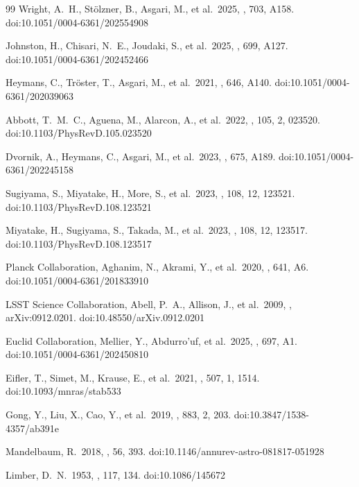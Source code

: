 \documentclass[a4paper, 11pt]{article}
\begin{document}
\begin{thebibliography}{99}
 Wright, A.~H., St{\"o}lzner, B., Asgari, M., et al.\ 2025, \aap, 703, A158. doi:10.1051/0004-6361/202554908

 Johnston, H., Chisari, N.~E., Joudaki, S., et al.\ 2025, \aap, 699, A127. doi:10.1051/0004-6361/202452466

 Heymans, C., Tr{\"o}ster, T., Asgari, M., et al.\ 2021, \aap, 646, A140. doi:10.1051/0004-6361/202039063

 Abbott, T.~M.~C., Aguena, M., Alarcon, A., et al.\ 2022, \prd, 105, 2, 023520. doi:10.1103/PhysRevD.105.023520

 Dvornik, A., Heymans, C., Asgari, M., et al.\ 2023, \aap, 675, A189. doi:10.1051/0004-6361/202245158

 Sugiyama, S., Miyatake, H., More, S., et al.\ 2023, \prd, 108, 12, 123521. doi:10.1103/PhysRevD.108.123521

 Miyatake, H., Sugiyama, S., Takada, M., et al.\ 2023, \prd, 108, 12, 123517. doi:10.1103/PhysRevD.108.123517

 Planck Collaboration, Aghanim, N., Akrami, Y., et al.\ 2020, \aap, 641, A6. doi:10.1051/0004-6361/201833910

 LSST Science Collaboration, Abell, P.~A., Allison, J., et al.\ 2009, , arXiv:0912.0201. doi:10.48550/arXiv.0912.0201

 Euclid Collaboration, Mellier, Y., Abdurro'uf, et al.\ 2025, \aap, 697, A1. doi:10.1051/0004-6361/202450810

 Eifler, T., Simet, M., Krause, E., et al.\ 2021, \mnras, 507, 1, 1514. doi:10.1093/mnras/stab533

 Gong, Y., Liu, X., Cao, Y., et al.\ 2019, \apj, 883, 2, 203. doi:10.3847/1538-4357/ab391e

 Mandelbaum, R.\ 2018, \araa, 56, 393. doi:10.1146/annurev-astro-081817-051928

 Limber, D.~N.\ 1953, \apj, 117, 134. doi:10.1086/145672


\end{thebibliography}
\end{document}
